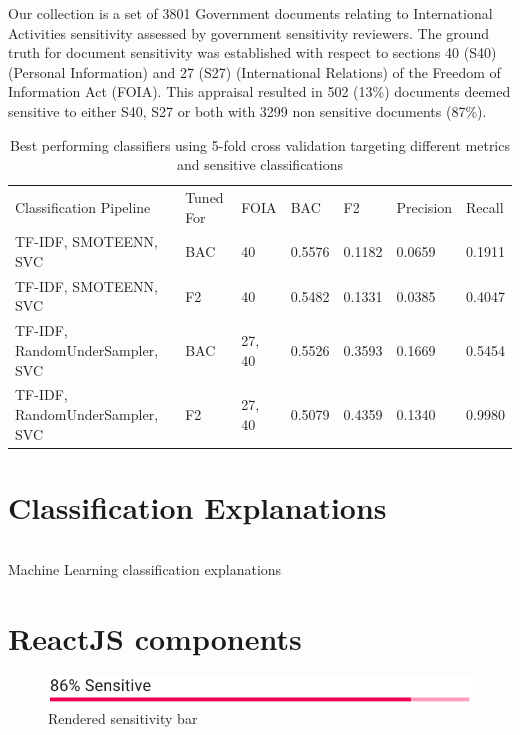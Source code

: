 \documentclass[\version]{l4proj}
\begin{document}
Our collection is a set of 3801 Government documents relating to International Activities sensitivity assessed by government sensitivity reviewers.
The ground truth for document sensitivity was established with respect to sections 40 (S40) (Personal Information) and 27 (S27) (International Relations) of the Freedom of Information Act (FOIA).
This appraisal resulted in 502 (13\%) documents deemed sensitive to either S40, S27 or both with 3299 non sensitive documents (87\%).

\begin{table}[H]
    \small
    \begin{tabular}{lllllll}
        Classification Pipeline         & Tuned For & FOIA   & BAC    & F2     & Precision & Recall \\
        TF-IDF, SMOTEENN, SVC           & BAC       & 40     & 0.5576 & 0.1182 & 0.0659    & 0.1911 \\
        TF-IDF, SMOTEENN, SVC           & F2        & 40     & 0.5482 & 0.1331 & 0.0385    & 0.4047 \\
        TF-IDF, RandomUnderSampler, SVC & BAC       & 27, 40 & 0.5526 & 0.3593 & 0.1669    & 0.5454 \\
        TF-IDF, RandomUnderSampler, SVC & F2        & 27, 40 & 0.5079 & 0.4359 & 0.1340    & 0.9980
    \end{tabular}
    \caption{Best performing classifiers using 5-fold cross validation targeting different metrics and sensitive classifications}\label{tab:clf_perf}
\end{table}

\section{Classification Explanations}

\begin{listing}[H]
    \inputminted{python}{code/explanations.py}
    \caption{Machine Learning classification explanations}\label{listing:ml_explanations}
\end{listing}

\section{ReactJS components}

\begin{figure}
    \includegraphics[width=\linewidth]{figures/sensitivity_bar.pdf}
    \caption{Rendered sensitivity bar}\label{fig:sensitivity_bar_preview}
    \vspace{-10pt}
\end{figure}
\end{document}
